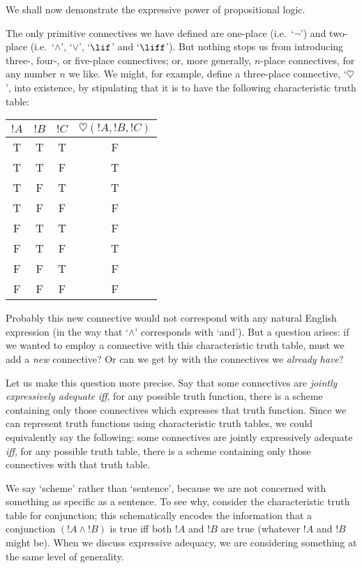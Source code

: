 \documentclass[../../../include/open-logic-section]{subfiles}
\begin{document}


We shall now demonstrate the expressive power of propositional logic.

The only primitive connectives we have defined are one-place (i.e.\ `$\lnot$') and two-place (i.e.\ `$\land$', `$\lor$', `$\lif$' and `$\liff$'). But nothing stops us from introducing three-, four-, or five-place connectives; or, more generally, $n$-place connectives, for any number $n$ we like. We might, for example, define a three-place connective, `$\heartsuit$', into existence, by stipulating that it is to have the following characteristic truth table:
\begin{center}
\begin{tabular}{c c c | c}
${!A}$ & ${!B}$ & ${!C}$ & $\heartsuit({!A},{!B},{!C})$\\
\hline
 T & T & T & F \\
 T & T & F & T \\
 T & F & T & T \\
 T & F & F & F \\
 F & T & T & F \\
 F & T & F & T \\
 F & F & T & F \\
 F & F & F & F
\end{tabular}
\end{center}
Probably this new connective would not correspond with any natural English expression (in the way that `$\land$' corresponds with `and'). But a question arises: if we wanted to employ a connective with this characteristic truth table, must we add a \emph{new} connective? Or can we get by with the connectives we \emph{already have}?

Let us make this question more precise. Say that some connectives are \emph{jointly expressively adequate} \emph{iff}, for any possible truth function, there is a scheme containing only those connectives which expresses that truth function. Since we can represent truth functions using characteristic truth tables, we could equivalently say the following: some connectives are jointly expressively adequate \emph{iff}, for any possible truth table, there is a scheme containing only those connectives with that truth table.

We say `scheme' rather than `sentence', because we are not concerned with something as specific as a sentence. To see why, consider the characteristic truth table for conjunction; this schematically encodes the information that a conjunction $({!A} \land {!B})$ is true iff both ${!A}$ and ${!B}$ are true (whatever ${!A}$ and ${!B}$ might be). When we discuss expressive adequacy, we are considering something at the same level of generality. 
\end{document}
